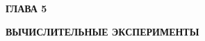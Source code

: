 \newpage
\begin{center}
	\textbf{\large ГЛАВА 5}

	\textbf{\large ВЫЧИСЛИТЕЛЬНЫЕ ЭКСПЕРИМЕНТЫ}
\end{center}
